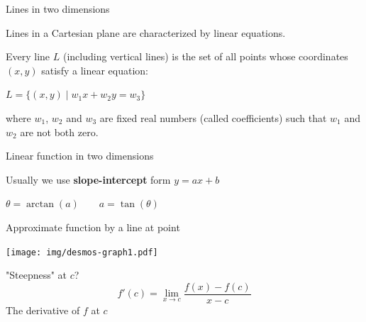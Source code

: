 \documentclass[12pt,aspectratio=169,handout]{beamer}
\begin{document}
\begin{frame}{Lines in two dimensions}
	
	Lines in a Cartesian plane are characterized by linear equations.
	
	Every line $L$ (including vertical lines) is the set of all points whose coordinates $(x, y)$ satisfy a linear equation:
	
	$L=\{(x,y)\mid w_1 x+ w_2 y= w_3\}$
	
	where $w_1$, $w_2$ and $w_3$ are fixed real numbers (called coefficients) such that $w_1$ and $w_2$ are not both zero.
	
\end{frame}


\begin{frame}{Linear function in two dimensions}
	
	Usually we use \textbf{slope-intercept} form $y= a x + b$
	
	
	
	$\theta = \arctan (a) \qquad a = \tan (\theta)$
	
\end{frame}



\begin{frame}{Approximate function by a line at point}
	
	
	\texttt{[image: img/desmos-graph1.pdf]}
	
	
	
	
	"Steepness" at $c$?
	$$f'(c) = \lim_{x \to c} \frac{f(x) - f(c)}{x - c}$$
	The derivative of $f$ at $c$
	
	
	
	
	
\end{frame}
\end{document}
